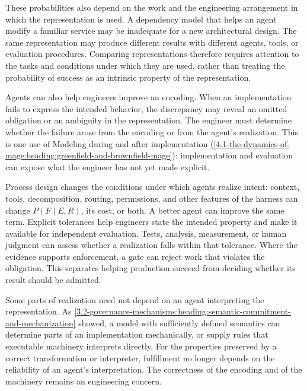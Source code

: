 These probabilities also depend on the work and the engineering arrangement in which the representation is used. A dependency model that helps an agent modify a familiar service may be inadequate for a new architectural design. The same representation may produce different results with different agents, tools, or evaluation procedures. Comparing representations therefore requires attention to the tasks and conditions under which they are used, rather than treating the probability of success as an intrinsic property of the representation.


Agents can also help engineers improve an encoding. When an implementation fails to express the intended behavior, the discrepancy may reveal an omitted obligation or an ambiguity in the representation. The engineer must determine whether the failure arose from the encoding or from the agent's realization. This is one use of Modeling during and after implementation (\cref{4.1-the-dynamics-of-mage:heading:greenfield-and-brownfield-mage}): implementation and evaluation can expose what the engineer has not yet made explicit.


Process design changes the conditions under which agents realize intent: context, tools, decomposition, routing, permissions, and other features of the harness can change \(P(F\mid E,R)\), its cost, or both. A better agent can improve the same term. Explicit tolerances help engineers state the intended property and make it available for independent evaluation. Tests, analysis, measurement, or human judgment can assess whether a realization falls within that tolerance. Where the evidence supports enforcement, a gate can reject work that violates the obligation. This separates helping production succeed from deciding whether its result should be admitted.

Some parts of realization need not depend on an agent interpreting the representation. As \autoref{3.2-governance-mechanisms:heading:semantic-commitment-and-mechanization} showed, a model with sufficiently defined semantics can determine parts of an implementation mechanically, or supply rules that executable machinery interprets directly. For the properties preserved by a correct transformation or interpreter, fulfillment no longer depends on the reliability of an agent's interpretation. The correctness of the encoding and of the machinery remains an engineering concern.

